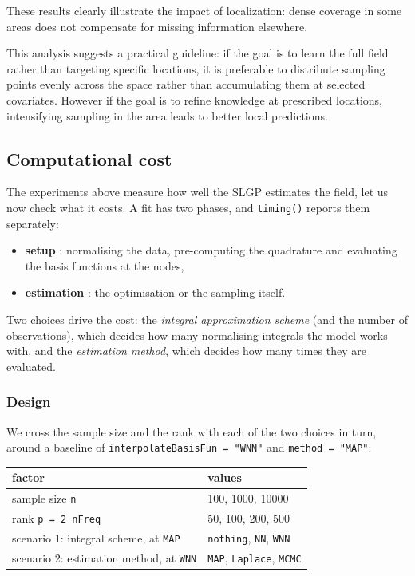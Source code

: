 \documentclass[
]{article}
\newcounter{none} %
\providecommand{\tightlist}{%
  \setlength{\itemsep}{0pt}\setlength{\parskip}{0pt}}
\begin{document}
These results clearly illustrate the impact of localization: dense coverage in some areas does not compensate for missing information elsewhere.

This analysis suggests a practical guideline: if the goal is to learn the full field rather than targeting specific locations, it is preferable to distribute sampling points evenly across the space rather than accumulating them at selected covariates.
However if the goal is to refine knowledge at prescribed locations, intensifying sampling in the area leads to better local predictions.

\subsection{Computational cost}\label{computational-cost}

The experiments above measure how well the SLGP estimates the field, let us now check what it costs. A fit has two phases, and \texttt{timing()} reports them separately:

\begin{itemize}
\tightlist
\item
  \textbf{setup} : normalising the data, pre-computing the quadrature and evaluating the basis functions at the nodes,
\item
  \textbf{estimation} : the optimisation or the sampling itself.
\end{itemize}

Two choices drive the cost: the \emph{integral approximation scheme} (and the number of observations), which decides how many normalising integrals the model works with, and the \emph{estimation method}, which decides how many times they are evaluated.

\subsubsection{Design}\label{design}

We cross the sample size and the rank with each of the two choices in turn,
around a baseline of \texttt{interpolateBasisFun\ =\ "WNN"} and \texttt{method\ =\ "MAP"}:

{\def\LTcaptype{none} %
\begin{longtable}[]{@{}ll@{}}
\toprule\noalign{}
factor & values \\
\midrule\noalign{}
\endhead
\bottomrule\noalign{}
\endlastfoot
sample size \texttt{n} & 100, 1000, 10000 \\
rank \texttt{p\ =\ 2\ nFreq} & 50, 100, 200, 500 \\
scenario 1: integral scheme, at \texttt{MAP} & \texttt{nothing}, \texttt{NN}, \texttt{WNN} \\
scenario 2: estimation method, at \texttt{WNN} & \texttt{MAP}, \texttt{Laplace}, \texttt{MCMC} \\
\end{longtable}
}
\end{document}

